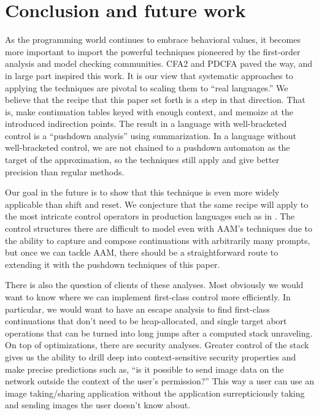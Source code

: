 \documentclass{llncs}
\begin{document}
\section{Conclusion and future work}

As the programming world continues to embrace behavioral values, it
becomes more important to import the powerful techniques pioneered by
the first-order analysis and model checking communities. CFA2 and
PDCFA paved the way, and in large part inspired this work. It is our
view that systematic approaches to applying the techniques are pivotal
to scaling them to ``real languages.'' We believe that the recipe that
this paper set forth is a step in that direction. That is, make
continuation tables keyed with enough context, and memoize at the
introduced indirection points. The result in a language with
well-bracketed control is a ``pushdown analysis'' using
summarization. In a language without well-bracketed control, we are
not chained to a pushdown automaton as the target of the
approximation, so the techniques still apply and give better precision
than regular methods.

Our goal in the future is to show that this technique is even more
widely applicable than shift and reset. We conjecture that the same
recipe will apply to the most intricate control operators in
production languages such as in
\citet{ianjohnson:Flatt:2007:ADC:1291151.1291178}. The control
structures there are difficult to model even with AAM's techniques due
to the ability to capture and compose continuations with arbitrarily many prompts,
but once we can tackle AAM, there should be a straightforward route to
extending it with the pushdown techniques of this paper.

There is also the question of clients of these analyses. Most
obviously we would want to know where we can implement first-class
control more efficiently. In particular, we would want to have an
escape analysis to find first-class continuations that don't need to
be heap-allocated, and single target abort operations that can be
turned into long jumps after a computed stack unraveling. On top of
optimizations, there are security analyses. Greater control of the
stack gives us the ability to drill deep into context-sensitive
security properties and make precise predictions such as, ``is it
possible to send image data on the network outside the context of the
user's permission?'' This way a user can use an image taking/sharing
application without the application surrepticiously taking and sending
images the user doesn't know about.



\end{document}
